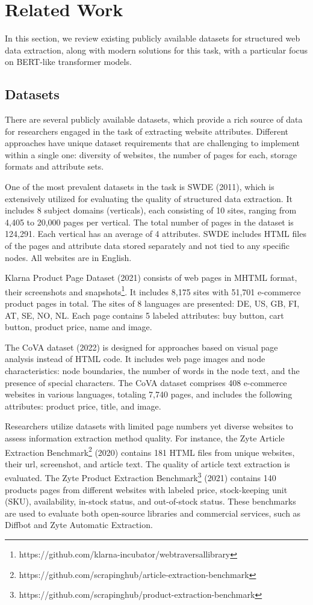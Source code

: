 \section{Related Work}
In this section, we review existing publicly available datasets for structured web data extraction, along with modern solutions for this task, with a particular focus on BERT-like transformer models.

\subsection{Datasets}

There are several publicly available datasets, which provide a rich source of data for researchers engaged in the task of extracting website attributes. Different approaches have unique dataset requirements that are challenging to implement within a single one: diversity of websites, the number of pages for each, storage formats and attribute sets.

One of the most prevalent datasets in the task is SWDE \cite{swde} (2011), which is extensively utilized for evaluating the quality of structured data extraction. It includes 8 subject domains (verticals), each consisting of 10 sites, ranging from 4,405 to 20,000 pages per vertical. The total number of pages in the dataset is 124,291. Each vertical has an average of 4 attributes. SWDE includes HTML files of the pages and attribute data stored separately and not tied to any specific nodes. All websites are in English.

Klarna Product Page Dataset \cite{klarna} (2021) consists of web pages in MHTML format, their screenshots and snapshots\footnote{https://github.com/klarna-incubator/webtraversallibrary}. It includes 8,175 sites with 51,701 e-commerce product pages in total. The sites of 8 languages are presented: DE, US, GB, FI, AT, SE, NO, NL. Each page contains 5 labeled attributes: buy button, cart button, product price, name and image.

The CoVA dataset \cite{cova} (2022) is designed for approaches based on visual page analysis instead of HTML code. It includes web page images and node characteristics: node boundaries, the number of words in the node text, and the presence of special characters. The CoVA dataset comprises 408 e-commerce websites in various languages, totaling 7,740 pages, and includes the following attributes: product price, title, and image.

Researchers utilize datasets with limited page numbers yet diverse websites to assess information extraction method quality. For instance, the Zyte Article Extraction Benchmark\footnote{https://github.com/scrapinghub/article-extraction-benchmark} (2020) contains 181 HTML files from unique websites, their url, screenshot, and article text. The quality of article text extraction is evaluated. The Zyte Product Extraction Benchmark\footnote{https://github.com/scrapinghub/product-extraction-benchmark} (2021) contains 140 products pages from different websites with labeled price, stock-keeping unit (SKU), availability, in-stock status, and out-of-stock status. These benchmarks are used to evaluate both open-source libraries and commercial services, such as Diffbot and Zyte Automatic Extraction.

